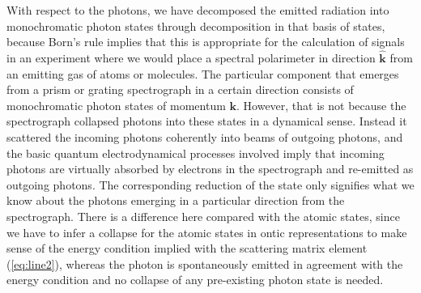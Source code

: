 \documentclass[final,3p,times,twocolumn]{elsarticle3}
\begin{document}
With respect to the photons, we have decomposed the emitted radiation into 
monochromatic photon states through decomposition in that basis of states, 
because Born's rule implies that this is appropriate for the calculation 
of signals in an experiment 
where we would place a spectral polarimeter in direction $\hat{\bm{k}}$ from 
an emitting gas of atoms or molecules. The particular component that emerges from 
a prism or grating spectrograph in a certain direction consists of monochromatic 
photon states of momentum $\bm{k}$. However, that is not because the 
spectrograph collapsed photons into these states in a dynamical sense. 
Instead it scattered the incoming photons coherently into beams of outgoing photons, 
and the basic quantum electrodynamical processes involved imply that incoming photons 
are virtually absorbed by electrons in the spectrograph and re-emitted as outgoing 
photons. The corresponding reduction of the state only signifies what we know about 
the photons emerging in a particular direction from the spectrograph.
There is a difference here compared with the atomic states, since we have to
infer a collapse for the atomic states in ontic representations to make
sense of the energy condition implied with the scattering matrix element (\ref{eq:line2}), 
whereas the photon is spontaneously emitted in agreement with the energy 
condition and no collapse of any pre-existing photon state is needed.
\end{document}
